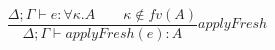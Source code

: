 \[
\frac { \Delta ;\Gamma \vdash e:\forall\kappa. A \quad \quad \kappa \notin fv(A) }{ \Delta ;\Gamma \vdash applyFresh(e):A } applyFresh
\]
